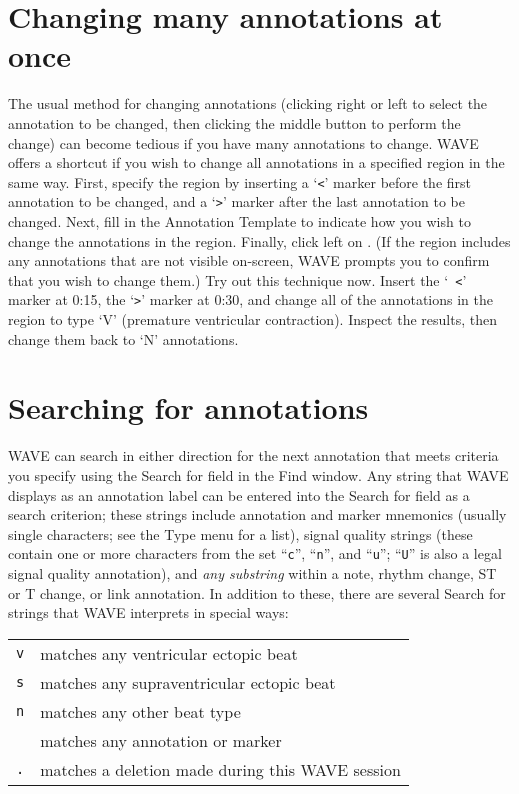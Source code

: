 \documentclass[twoside]{book}
\newcommand{\button}[1]{\cornersize{2}\ovalbox{\rule[-.3mm]{0cm}{2.5mm}\small\sf ~#1~}}
\newcommand{\WAVE}{{\sf WAVE}\xspace}
\begin{document}
\section{Changing many annotations at once}

The usual method for changing annotations (clicking right or left to select the
annotation to be changed, then clicking the middle button to perform the
change) can become tedious if you have many annotations to change.  \WAVE{}
offers a shortcut
if you wish to change all annotations in a specified region
in the same way.  First, specify the region by inserting a `{\tt <}' marker
before the first annotation to be changed, and a `{\tt >}' marker after the
last annotation to be changed.  Next, fill in the {\sf Annotation Template} to
indicate how you wish to change the annotations in the region.  Finally, click
left on \button{Change all in range}.  (If the region includes any
annotations that are not visible on-screen, \WAVE{} prompts you to confirm
that you wish to change them.)  Try out this technique now.  Insert the `{\tt
<}' marker at 0:15, the `{\tt >}' marker at 0:30, and change all of the
annotations in the region to type `{\sf V}' (premature ventricular
contraction).  Inspect the results, then change them back to `{\sf N}'
annotations.

\section{Searching for annotations}

\label{sec:searching}
\WAVE{} can search in either direction for the next annotation that
meets criteria you specify using the {\sf Search for} field in the
{\sf Find} window.  Any string that \WAVE{} displays as an annotation
label can be entered into the {\sf Search for} field as a search
criterion;  these strings include annotation and marker mnemonics
(usually single characters;  see the {\sf Type} menu for a list),
signal quality strings (these contain one or more characters from the set
``{\tt c}'', ``{\tt n}'', and ``{\tt u}''; ``{\tt U}'' is also a legal
signal quality annotation), and {\em any substring} within a note,
rhythm change, ST or T change, or link annotation.  In addition to
these, there are several {\sf Search for} strings that \WAVE{}
interprets in special ways:

\begin{tabular*}{5.5 in}{l p{4.75 in}}
{\tt *v} & {matches any ventricular ectopic beat} \\
{\tt *s} & {matches any supraventricular ectopic beat} \\
{\tt *n} & {matches any other beat type} \\
{\tt *}  & {matches any annotation or marker} \\
{\tt .}  & {matches a deletion made during this \WAVE{} session} \\
\end{tabular*}
\end{document}
